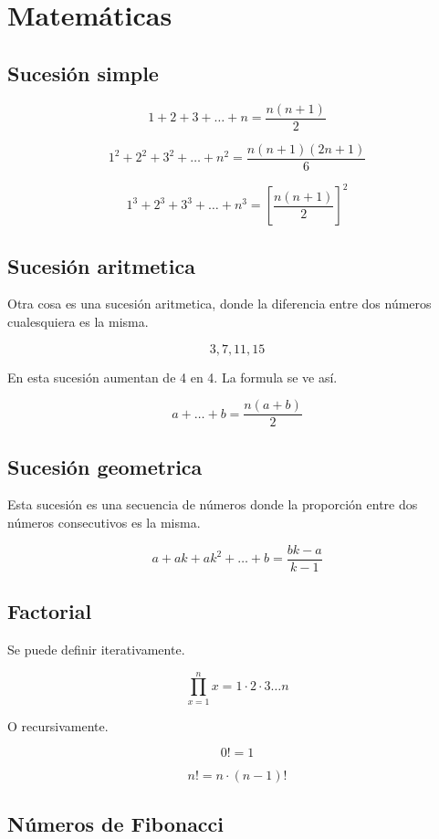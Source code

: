 \documentclass[10pt]{article}
\begin{document}
\section{Matemáticas}

\subsection{Sucesión simple}

\[ 1 + 2 + 3 + \dots + n = \frac{n(n + 1)}{2} \]

\[ 1^2 + 2^2 + 3^2 + \dots + n^2 = \frac{n(n + 1)(2n + 1)}{6} \]

\[ 1^3 + 2^3 + 3^3 + \dots + n^3 = \left[\frac{n(n + 1)}{2}\right]^2 \]

\subsection{Sucesión aritmetica}

Otra cosa es una sucesión aritmetica, donde la diferencia entre dos números cualesquiera es la misma.

\[ 3, 7, 11, 15 \]

En esta sucesión aumentan de 4 en 4. La formula se ve así.

\[ a + \dots + b = \frac{n(a + b)}{2} \]

\subsection{Sucesión geometrica}

Esta sucesión es una secuencia de números donde la proporción entre dos números consecutivos es la misma.

\[ a + ak + ak^2 + \dots + b = \frac{bk - a}{k - 1} \]

\subsection{Factorial}

Se puede definir iterativamente.

\[ \prod_{x=1}^{n} x = 1 \cdot 2 \cdot 3 \dots n \]

O recursivamente.

\[ 0! = 1 \]

\[ n! = n \cdot (n - 1)! \]

\subsection{Números de Fibonacci}
\end{document}
